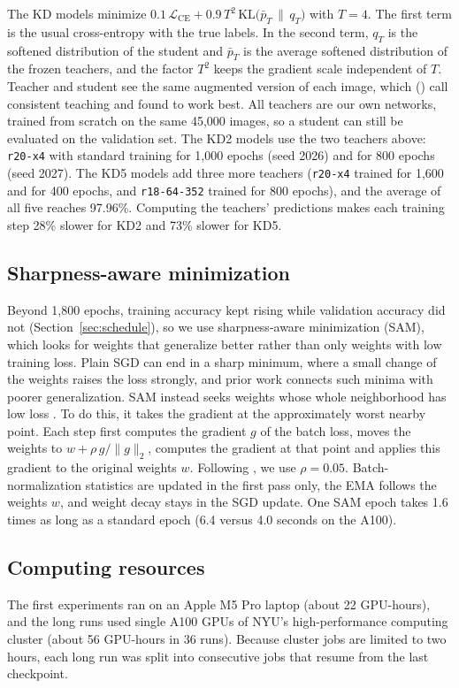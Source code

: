\documentclass[letterpaper]{article}
\begin{document}
The KD models minimize $0.1\,\mathcal{L}_{\mathrm{CE}}+0.9\,T^{2}\,\mathrm{KL}\big(\bar{p}_{T}\,\|\,q_{T}\big)$ with $T=4$. The
first term is the usual cross-entropy with the true labels. In the second term, $q_T$ is the softened distribution of the student
and $\bar{p}_T$ is the average softened distribution of the frozen teachers, and the factor $T^2$ keeps the gradient scale
independent of $T$. Teacher and student see the same augmented version of each image, which \citeauthor{beyer2022knowledge}
(\citeyear{beyer2022knowledge}) call consistent teaching and found to work best. All teachers are our own networks, trained from
scratch on the same 45,000 images, so a student can still be evaluated on the validation set. The KD2 models use the two teachers
above: \texttt{r20-x4} with standard training for 1,000 epochs (seed 2026) and for 800 epochs (seed 2027). The KD5 models add three
more teachers (\texttt{r20-x4} trained for 1,600 and for 400 epochs, and \texttt{r18-64-352} trained for 800 epochs), and the
average of all five reaches 97.96\%. Computing the teachers' predictions makes each training step 28\% slower for KD2 and 73\%
slower for KD5.

\subsection{Sharpness-aware minimization}
\label{sec:sam}
Beyond 1,800 epochs, training accuracy kept rising while validation accuracy did not (Section~\ref{sec:schedule}), so we use
sharpness-aware minimization (SAM), which looks for weights that generalize better rather than only weights with low training loss.
Plain SGD can end in a sharp minimum, where a small change of the weights raises the loss strongly, and prior work connects such
minima with poorer generalization. SAM instead seeks weights whose whole neighborhood has low loss
\cite{foret2021sharpness}. To do this, it takes the gradient at the approximately worst nearby point. Each step first computes the
gradient $g$ of the batch loss, moves the weights to $w+\rho\,g/\|g\|_2$, computes the gradient at that point and applies this
gradient to the original weights $w$. Following \citeauthor{foret2021sharpness}, we use $\rho=0.05$.
Batch-normalization statistics are updated in the first pass only, the EMA follows the weights $w$, and weight decay stays in the
SGD update. One SAM epoch takes 1.6 times as long as a standard epoch (6.4 versus 4.0 seconds on the A100).

\subsection{Computing resources}
The first experiments ran on an Apple M5 Pro laptop (about 22 GPU-hours), and the long runs used single A100 GPUs of NYU's
high-performance computing cluster (about 56 GPU-hours in 36 runs). Because cluster jobs are limited to two hours, each long run was
split into consecutive jobs that resume from the last checkpoint.
\end{document}
